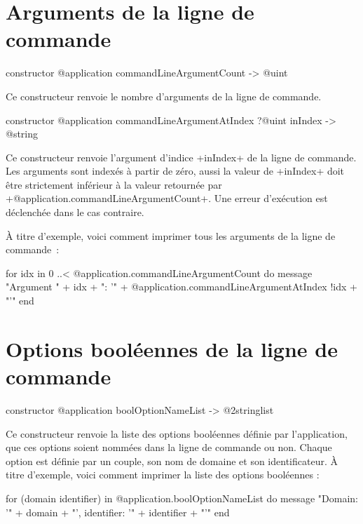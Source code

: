 \section{Arguments de la ligne de commande}



\begin{galgasbox}
constructor @application commandLineArgumentCount -> @uint
\end{galgasbox}

Ce constructeur renvoie le nombre d'arguments de la ligne de commande.



\begin{galgasbox}
constructor @application commandLineArgumentAtIndex ?@uint inIndex
  -> @string
\end{galgasbox}

Ce constructeur renvoie l'argument d'indice \ggs+inIndex+ de la ligne de commande. Les arguments sont indexés à partir de zéro, aussi la valeur de \ggs+inIndex+ doit être strictement inférieur à la valeur retournée par \ggs+@application.commandLineArgumentCount+. Une erreur d'exécution est déclenchée dans le cas contraire.

À titre d'exemple, voici comment imprimer tous les arguments de la ligne de commande~:
\begin{galgas}
for idx in 0 ..< @application.commandLineArgumentCount do
  message "Argument " + idx + ": '"
    + @application.commandLineArgumentAtIndex {!idx} + "'\n"
end
\end{galgas}










\section{Options booléennes de la ligne de commande}


\begin{galgasbox}
constructor @application boolOptionNameList -> @2stringlist
\end{galgasbox}

Ce constructeur renvoie la liste des options booléennes définie par l'application, que ces options soient nommées dans la ligne de commande ou non. Chaque option est définie par un couple, son nom de domaine et son identificateur. À titre d'exemple, voici comment imprimer la liste des options booléennes :
\begin{galgas}
for (domain identifier) in @application.boolOptionNameList do
  message "Domain: '" + domain + "', identifier: '" + identifier + "'\n"
end
\end{galgas}


